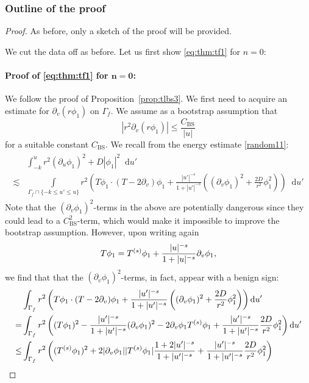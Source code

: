 \documentclass[11pt,english]{article}
\numberwithin{equation}{section}
\theoremstyle{remark}
\theoremstyle{plain}
\theoremstyle{remark}
\newcommand{\dd}{\mathop{}\!\mathrm{d}}
\newcommand{\pu}{\partial_u}
\newcommand{\pv}{\partial_v}
\renewcommand{\(}{\left(}
\renewcommand{\)}{\right)}
\begin{document}
\subsubsection{Outline of the proof}
\begin{proof}
As before, only a sketch of the proof will be provided.

We cut the data off as before. Let us first show \eqref{eq:thm:tf1} for $n=0$:
\paragraph{Proof of \eqref{eq:thm:tf1} for $\mathbf{n=0}$:}
We follow the proof of Proposition~\ref{prop:tlbs3}. We first need to acquire an estimate for $\pv(r\phi_1)$ on $\Gamma_f$. We assume as a bootstrap assumption that
\begin{equation}
|r^2\pv(r\phi_1)|\leq \frac{C_{\mathrm{BS}}}{|u|}
\end{equation} 
for a suitable constant $C_{\mathrm{BS}}$.
We recall from the energy estimate \eqref{random11}:
\begin{align}\label{random2}
\begin{split}
&\int_{-k}^u r^2(\pu \phi_{1})^2+D|\phi_{1}|^2\dd u'	 \\
\lesssim &\int\limits_{\Gamma_f\cap\{-k\leq u'\leq u\}}  r^2 \left(T\phi_{1}\cdot (T-2\pv) \phi_{1}+\frac{|u'|^{-s}}{1+|u'|^{-s}}\left((\pv \phi_1)^2+\frac{2D}{r^2}\phi_1^2\right)	\right) \dd u'
\end{split}
\end{align}
Note that the $(\pv\phi_1)^2$-terms in the above are potentially dangerous since they could lead to a $C_{\mathrm{BS}}^2$-term, which would make it impossible to improve the bootstrap assumption. However, upon writing again 
\begin{equation}
T\phi_1=\te \phi_1 +\frac{|u|^{-s}}{1+|u|^{-s}}\pv\phi_1,
\end{equation}
we find that that the $(\pv\phi_1)^2$-terms, in fact, appear with a benign sign:
\begin{align*}
&\int_{\Gamma_f}  r^2 \left(T\phi_{1}\cdot (T-2\pv) \phi_{1}+\frac{|u'|^{-s}}{1+|u'|^{-s}}\left((\pv \phi_1)^2+\frac{2D}{r^2}\phi_1^2\right)	\right) \dd u'\\
=&\int_{\Gamma_f}   r^2 \left(		(T\phi_1)^2-\frac{|u'|^{-s}}{1+|u'|^{-s}}(\pv\phi_1)^2-2\pv\phi_1\te\phi_1+\frac{|u'|^{-s}}{1+|u'|^{-s}}\frac{2D}{r^2}\phi_1^2\right)\dd u'\\
\leq& \int_{\Gamma_f}   r^2 \left(		(\te\phi_1)^2+2|\pv\phi_1||\te\phi_1|\frac{1+2|u'|^{-s}}{1+|u'|^{-s}}+\frac{|u'|^{-s}}{1+|u'|^{-s}}\frac{2D}{r^2}\phi_1^2\right)%

\end{align*}
\end{proof}
\end{document}
